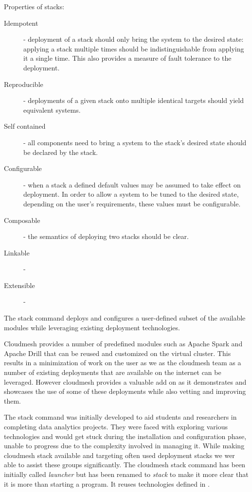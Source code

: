 Properties of stacks:
\begin{description}
\item [Idempotent] - deployment of a stack should only bring the
  system to the desired state: applying a stack multiple times should
  be indistinguishable from applying it a single time. This also
  provides a measure of fault tolerance to the deployment.
\item [Reproducible] - deployments of a given stack onto multiple
  identical targets should yield equivalent systems.
\item [Self contained] - all components need to bring a system to the
  stack's desired state should be declared by the stack.
\item [Configurable] - when a stack a defined default values may be
  assumed to take effect on deployment. In order to allow a system to
  be tuned to the desired state, depending on the user's requirements,
  these values must be configurable.
\item [Composable] - the semantics of deploying two stacks should be clear.
\item [Linkable] - 
\item [Extensible] -
\end{description}


The stack command deploys and configures a user-defined subset of the
available modules while leveraging existing deployment technologies.

Cloudmesh provides a number of predefined modules such as Apache Spark
and Apache Drill that can be reused and customized on the virtual
cluster. This results in a minimization of work on the user as we as
the cloudmesh team as a number of existing deployments that are
available on the internet can be leveraged. However cloudmesh provides
a valuable add on as it demonstrates and showcases the use of some of
these deployments while also vetting and improving them.


The stack command was initially developed to aid students and
researchers in completing data analytics projects.  They were faced
with exploring various technologies and would get stuck during the
installation and configuration phase, unable to progress due to the
complexity involved in managing it. While making cloudmesh stack
available and targeting often used deployment stacks we wer able to
assist these groups significantly.  The cloudmesh stack command has
been initially called {\it launcher} but has been renamed to {\em
  stack} to make it more clear that it is more than starting a
program. It reuses technologies defined in .

